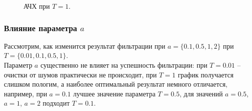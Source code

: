 \documentclass[a5paper, 10pt]{article}
\theoremstyle{definition}
\theoremstyle{plain}
\theoremstyle{remark}
\begin{document}
\begin{figure}[h!]
\caption{АЧХ при $T = 1$.}
\end{figure}

\subsubsection{Влияние параметра $a$}
Рассмотрим, как изменится результат фильтрации при $a = \{0.1, 0.5, 1, 2\}$ при $T=\{ 0.01, 0.1, 0.5, 1\}$.\\

Параметр $a$ существенно не влияет на успешность фильтрации: при $T=0.01$ -- очистки от шумов практически не происходит, при $T=1$ график получается слишком пологим, а наиболее оптимальный результат немного отличается, например, при $a=0.1$ лучшее значение параметра $T=0.5$, для значений $a=0.5$, $a=1$, $a=2$ подходит $T=0.1$.
\end{document}
